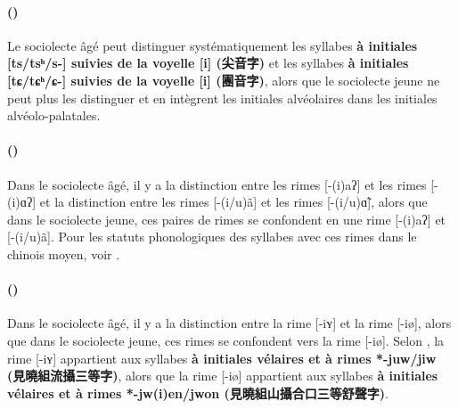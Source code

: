 \documentclass{scrbook}
\newcounter{c}[subsubsection]
\newcommand{\stpc}[1]{\stepcounter{#1}}
\newcommand{\termyyx}[1]{\textbf{#1}}
\begin{document}
\begin{sloppypar}
\stpc{c}\paragraph{()}
Le sociolecte âgé peut distinguer systématiquement les syllabes \termyyx{à initiales [ts/tsʰ/s-] suivies de la voyelle [i] (尖音字)} et les syllabes \termyyx{à initiales [tɕ/tɕʰ/ɕ-] suivies de la voyelle [i] (團音字)}, alors que le sociolecte jeune ne peut plus les distinguer et en intègrent les initiales alvéolaires dans les initiales alvéolo-palatales.

\stpc{c}\paragraph{()}
Dans le sociolecte âgé, il y a la distinction entre les rimes [-(i)aʔ] et les rimes [-(i)ɑʔ] et la distinction entre les rimes [-(i/u)ã] et les rimes [-(i/u)ɑ̃], alors que dans le sociolecte jeune, ces paires de rimes se confondent en une rime [-(i)aʔ] et [-(i/u)ã]. Pour les statuts phonologiques des syllabes avec ces rimes dans le chinois moyen, voir \textcite[28-33]{Wang1996suzhou}.






\stpc{c}\paragraph{()}
Dans le sociolecte âgé, il y a la distinction entre la rime [-iʏ] et la rime [-iø], alors que dans le sociolecte jeune, ces rimes se confondent vers la rime [-iø]. Selon \textcite[28-33]{Wang1996suzhou}, la rime [-iʏ] appartient aux syllabes \termyyx{à initiales vélaires et à rimes *-juw/jiw (見曉組流攝三等字)}, alors que la rime [-iø] appartient aux syllabes \termyyx{à initiales vélaires et à rimes *-jw(i)en/jwon (見曉組山攝合口三等舒聲字)}.


\end{sloppypar}
\end{document}
